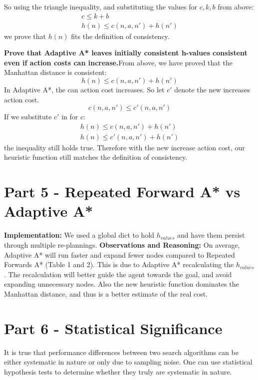 \documentclass[10pt]{article}
\begin{document}
So using the triangle inequality, and substituting the values for \(c, k, b\) from above:
\begin{gather*} 
c \le k + b \\ 
h(n) \le c(n, a, n') + h(n')
\end{gather*}
we prove that $h(n)$ fits the definition of consistency.

\textbf{Prove that Adaptive A* leaves initially consistent h-values consistent even if action costs can increase.}From above, we have proved that the Manhattan distance is consistent:
\[h(n) \le c(n, a, n') + h(n')\]
In Adaptive A*, the can action cost increases. So let \(c'\) denote the new increases action cost. 
\[c(n, a, n') \le c'(n, a, n')\]
If we substitute \(c'\) in for \(c\):
\begin{gather*} 
h(n) \le c(n, a, n') + h(n') \\ 
h(n) \le c'(n, a, n') + h(n')
\end{gather*}
the inequality still holds true. Therefore with the new increase action cost, our heuristic function still matches the definition of consistency.

\section*{Part 5 - Repeated Forward A* vs Adaptive A*}
\textbf{Implementation: }We used a global dict to hold $h_{values}$ and have them persist through multiple re-plannings. \textbf{Observations and Reasoning: }On average, Adaptive A* will run faster and expand fewer nodes compared to Repeated Forwards A* (Table 1 and 2). This is due to Adaptive A* recalculating the $h_{values}$. The recalculation will better guide the agent towards the goal, and avoid expanding unnecessary nodes. Also the new heuristic function dominates the Manhattan distance, and thus is a better estimate of the real cost.

\section*{Part 6 - Statistical Significance}

It is true that performance differences between two search algorithms can be either systematic in nature or only due to sampling noise. One can use statistical hypothesis tests to determine whether  they truly are systematic in nature.\newline
\end{document}
